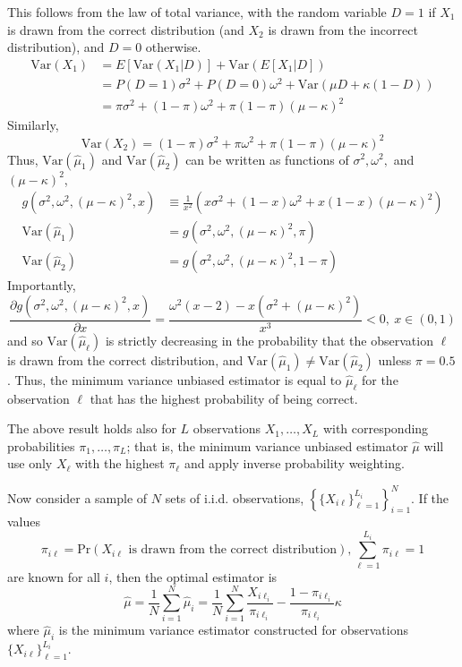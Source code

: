\documentclass[11pt]{amsart}
\newcommand{\Var}[1]{\text{Var}\left(#1\right)}
\begin{document}
This follows from the law of total variance, with the random variable $D = 1$ if $X_1$ is drawn from the correct distribution (and $X_2$ is drawn from the incorrect distribution), and $D=0$ otherwise. 
\begin{align*} \Var{X_1} &= E[\Var{X_1 | D}] + \Var{E[X_1| D]} \\ 
&= P(D=1)\sigma^2 +  P(D=0)\omega^2 + \Var{\mu D + \kappa (1-D)} \\
&= \pi \sigma^2 + (1-\pi) \omega^2 + \pi(1-\pi)(\mu-\kappa)^2
\end{align*}
Similarly,
$$\Var{X_2} = (1-\pi)\sigma^2 + \pi \omega^2 + \pi(1-\pi)(\mu-\kappa)^2 $$ 
Thus, $\Var{\hat{\mu}_1}$ and $\Var{\hat{\mu}_2}$ can be written as functions of $\sigma^2, \omega^2,$ and $(\mu-\kappa)^2$,
\begin{align*} 
g(\sigma^2, \omega^2, (\mu-\kappa)^2, x) &\equiv  \frac{1}{x^2}\left(x \sigma^2 + (1-x)\omega^2 + x (1-x) (\mu -\kappa)^2\right)\\
\Var{\hat{\mu}_1} &= g(\sigma^2, \omega^2, (\mu-\kappa)^2, \pi) \\
\Var{\hat{\mu}_2} &= g(\sigma^2, \omega^2, (\mu-\kappa)^2, 1-\pi) 
\end{align*}
Importantly, 
$$\frac{\partial g(\sigma^2, \omega^2, (\mu-\kappa)^2, x)}{\partial x} = \frac{\omega^2 (x-2) - x (\sigma^2 + (\mu-\kappa)^2)}{x^3}< 0,  \ x \in (0,1)$$
and so $\Var{\hat{\mu}_{\ell}}$ is strictly decreasing in the probability that the observation $\ell$ is drawn from the correct distribution, and $\Var{\hat{\mu}_1} \neq \Var{\hat{\mu}_2}$ unless $\pi = 0.5$.   Thus, the minimum variance unbiased estimator is equal to $\hat{\mu}_{\ell}$ for the observation $\ell$ that has the highest probability of being correct.

The above result holds also for $L$ observations $X_1, \dots, X_{L}$ with corresponding probabilities $\pi_1,\dots, \pi_L$; that is, the minimum variance unbiased estimator $\hat{\mu}$ will use only $X_{\ell}$ with the highest $\pi_{\ell}$ and apply inverse probability weighting. 

Now consider a sample of $N$ sets of i.i.d. observations, $\left\{\{X_{i\ell}\}_{\ell=1}^{L_i}\right\}_{i=1}^N$.  If the values $$\pi_{i\ell} = \text{Pr}(X_{i\ell}\text{ is drawn from the correct distribution}),   \sum_{\ell=1}^{L_i} \pi_{i\ell} = 1$$ are known for all $i$, then the optimal estimator is 
$$\hat{\mu} = \frac{1}{N} \sum_{i=1}^N \hat{\mu}_i  = \frac{1}{N}\sum_{i=1}^N \frac{X_{i\ell_i}}{\pi_{i\ell_i}} - \frac{1-\pi_{i\ell_i}}{\pi_{i\ell_i}}\kappa$$
where $\hat{\mu}_i$ is the minimum variance estimator constructed for observations $\{X_{i\ell}\}_{\ell=1}^{L_i}$. 
\end{document}
